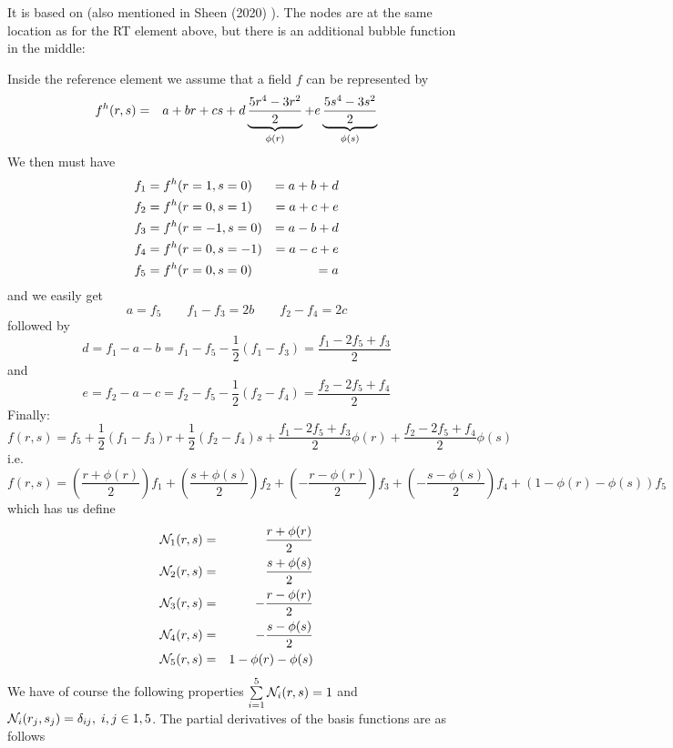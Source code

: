 

It is based on \textcite{han84} (also mentioned in Sheen (2020) \cite{shee20}).
The nodes are at the same location as for the RT element above, but 
there is an additional bubble function in the middle:



Inside the reference element we assume that a field $f$
can be represented by 
\begin{eqnarray}
f^h(r,s) 
&=& a+ br +cs +d \underbrace{\frac{5r^4-3r^2}{2}}_{\phi(r)}
+e \underbrace{\frac{5s^4-3s^2}{2}}_{\phi(s)} \nonumber
\end{eqnarray}
We then must have 
\begin{align}
f_1 &= f^h(r=1,s=0) &= a+ b +d \nonumber\\
f_2 &= f^h(r=0,s=1) &= a+ c +e \nonumber\\
f_3 &= f^h(r=-1,s=0) &= a- b +d \nonumber\\
f_4 &= f^h(r=0,s=-1) &= a -c +e \nonumber\\
f_5 &= f^h(r=0,s=0) &= a  \nonumber
\end{align}
and we easily get 
\[
a = f_5 
\qquad
f_1-f_3 = 2b
\qquad 
f_2-f_4 = 2c
\]
followed by
\[
d=f_1-a-b = f_1 - f_5 - \frac{1}{2}(f_1-f_3) = \frac{f_1-2f_5+f_3}{2}
\]
and 
\[
e = f_2-a-c = f_2 - f_5 -  \frac{1}{2}(f_2-f_4) = \frac{f_2 -2f_5+f_4 }{2}
\]
Finally:
\[
f(r,s) = 
f_5 +
\frac{1}{2}(f_1-f_3) r+
\frac{1}{2}(f_2-f_4) s+
\frac{f_1-2f_5+f_3}{2} \phi(r)+
\frac{f_2 -2f_5+f_4 }{2} \phi(s)
\]
i.e.
\[
f(r,s) = 
\left(\frac{r + \phi(r)}{2} \right)f_1 +
\left(\frac{s+\phi(s)}{2} \right)f_2 +
\left(-\frac{r-\phi(r)}{2} \right)f_3 +
\left(-\frac{s - \phi(s)}{2} \right)f_4 +
\left(1-\phi(r)-\phi(s) \right)f_5 
\]
which has us define 
\begin{eqnarray}
{\mathcal{N}}_1(r,s) &=& \frac{r + \phi(r)}{2} \nonumber\\
{\mathcal{N}}_2(r,s) &=& \frac{s+\phi(s)}{2} \nonumber\\
{\mathcal{N}}_3(r,s) &=& -\frac{r-\phi(r)}{2} \nonumber\\
{\mathcal{N}}_4(r,s) &=& -\frac{s - \phi(s)}{2}\nonumber\\
{\mathcal{N}}_5(r,s) &=& 1-\phi(r)-\phi(s)\nonumber
\end{eqnarray}
We have of course the following properties $\sum\limits_{i=1}^5 {\mathcal{N}}_i(r,s) = 1$ and 
${\mathcal{N}}_i(r_j,s_j) = \delta_{ij},\;  i,j \in 1,5$. 
The partial derivatives of the basis functions are as follows
